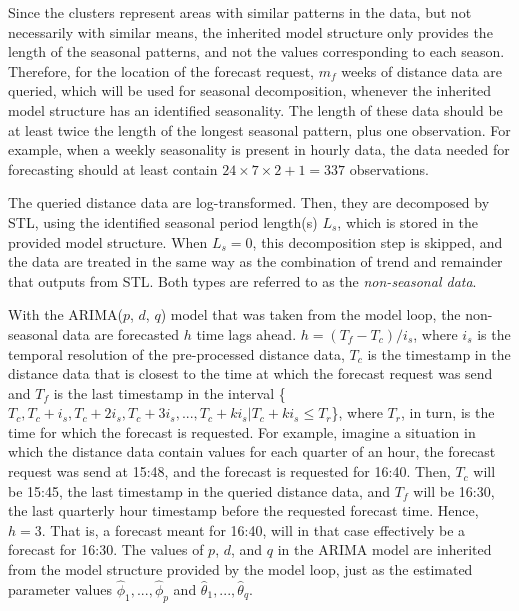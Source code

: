 \documentclass[12pt,oneside]{reedthesis}
\begin{document}
Since the clusters represent areas with similar patterns in the data,
but not necessarily with similar means, the inherited model structure
only provides the length of the seasonal patterns, and not the values
corresponding to each season. Therefore, for the location of the
forecast request, \(m_{f}\) weeks of distance data are queried, which
will be used for seasonal decomposition, whenever the inherited model
structure has an identified seasonality. The length of these data should
be at least twice the length of the longest seasonal pattern, plus one
observation. For example, when a weekly seasonality is present in hourly
data, the data needed for forecasting should at least contain
\(24 \times 7 \times 2 + 1 = 337\) observations.

The queried distance data are log-transformed. Then, they are decomposed
by STL, using the identified seasonal period length(s) \(L_{s}\), which
is stored in the provided model structure. When \(L_{s} = 0\), this
decomposition step is skipped, and the data are treated in the same way
as the combination of trend and remainder that outputs from STL. Both
types are referred to as the \emph{non-seasonal data}.

With the ARIMA(\(p\), \(d\), \(q\)) model that was taken from the model
loop, the non-seasonal data are forecasted \(h\) time lags ahead.
\(h = (T_{f} - T_{c}) / i_{s}\), where \(i_{s}\) is the temporal
resolution of the pre-processed distance data, \(T_{c}\) is the
timestamp in the distance data that is closest to the time at which the
forecast request was send and \(T_{f}\) is the last timestamp in the
interval
\{\(T_{c}, T_{c} + i_{s}, T_{c} + 2i_{s}, T_{c} + 3i_{s}, ..., T_{c} + ki_{s} | T_{c} + ki_{s} \leq T_{r}\)\},
where \(T_{r}\), in turn, is the time for which the forecast is
requested. For example, imagine a situation in which the distance data
contain values for each quarter of an hour, the forecast request was
send at 15:48, and the forecast is requested for 16:40. Then, \(T_{c}\)
will be 15:45, the last timestamp in the queried distance data, and
\(T_{f}\) will be 16:30, the last quarterly hour timestamp before the
requested forecast time. Hence, \(h = 3\). That is, a forecast meant for
16:40, will in that case effectively be a forecast for 16:30. The values
of \(p\), \(d\), and \(q\) in the ARIMA model are inherited from the
model structure provided by the model loop, just as the estimated
parameter values \(\hat\phi_{1},...,\hat\phi_{p}\) and
\(\hat\theta_{1},...,\hat\theta_{q}\).
\end{document}
